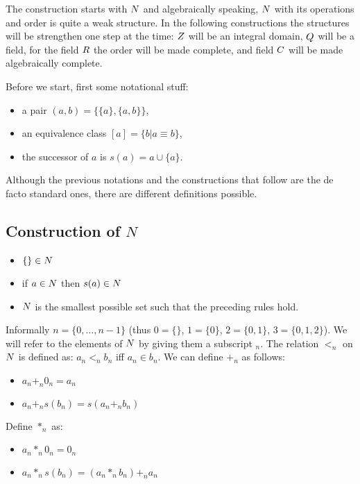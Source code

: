 The construction starts with $N$ and algebraically speaking, $N$ with
its operations and order is quite a weak structure. In the following
constructions the structures will be strengthen one step at the time:
$Z$ will be an integral domain, $Q$ will be a field, for the field
$R$ the order will be made complete, and field $C$ will be made
algebraically complete.
%
%

Before we start, first some notational stuff:
\begin{itemize}
  \item a pair $(a,b) = \{\{a\},\{a,b\}\}$,
  \item an equivalence class $[a] = \{b | a \equiv b\}$,
  \item the successor of $a$ is $s(a) = a \cup \{a\}$.
\end{itemize}

Although the previous notations and the constructions that follow are
the de facto standard ones, there are different definitions possible.

\subsection{Construction of \sl $N$}

\begin{itemize}
  \item $\{\} \in N$
  \item if $a \in N$ then $s(a) \in N$
  \item $N$ is the smallest possible set such that the preceding rules
  hold.
\end{itemize}
Informally $n=\{0,\ldots,n-1\}$ (thus $0=\{\}$, $1=\{0\}$, $2=\{0,1\}$,
$3=\{0,1,2\}$). We will refer to the elements of $N$ by giving them a
subscript $_n$. The relation $<_n$ on $N$ is defined as: $a_n <_n b_n$
iff $a_n \in b_n$. We can define $+_n$ as follows:
\begin{itemize}
  \item $a_n +_n 0_n = a_n$
  \item $a_n +_n s(b_n) = s(a_n +_n b_n)$
\end{itemize}
Define $*_n$ as:
\begin{itemize}
  \item $a_n *_n 0_n = 0_n$
  \item $a_n *_n s(b_n) = (a_n *_n b_n) +_n a_n$
\end{itemize}


